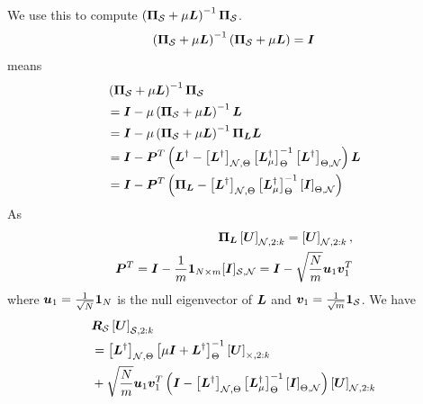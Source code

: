 We use this to compute $\left(\proj{S} + \mu\matr{L} \right)^{-1}\proj{S}$. 
\begin{equation}
 \left(\proj{S} + \mu\matr{L} \right)^{-1}\left(\proj{S} + \mu\matr{L} \right) = \matr{I}
\end{equation}
 means
\begin{align}
 &\left(\proj{S} + \mu\matr{L} \right)^{-1}\proj{S} 
 \\&= \matr{I} - \mu\left(\proj{S} + \mu\matr{L} \right)^{-1}\matr{L} \\
 &= \matr{I} - \mu\left(\proj{S} + \mu\matr{L} \right)^{-1}\projgen{\matr{L}}\matr{L} \\
 &= \matr{I} - \matr{P}^{T}\left( \matr{L}^{\dagger} - \msubgen[\set{N},\Theta]{\matr{L}^{\dagger}} \msubgen[\Theta]{ \matr{L}_{\mu}^{\dagger}}^{-1}\msubgen[\Theta,\set{N}]{\matr{L}^{\dagger}}\right)\matr{L}\\
 &= \matr{I} - \matr{P}^{T}\left( \projgen{\matr{L}} - \msubgen[\set{N},\Theta]{\matr{L}^{\dagger}} \msubgen[\Theta]{ \matr{L}_{\mu}^{\dagger}}^{-1}\msubgen[\Theta,\set{N}]{\matr{I}}\right)
\end{align}
As 
\begin{align}
\projgen{\matr{L}}\msubgen[\set{N},2:k]{\matr{U}} = \msubgen[\set{N},2:k]{\matr{U}}, \\
\matr{P}^{T} = \matr{I} - \frac{1}{m}\matr{1}_{N \times m}\matrsub[S,N]{I} = \matr{I} - \sqrt{\frac{N}{m}}\vect{u}_{1}\matr{v}_{1}^{T}
\end{align}
where $\bm{u}_{1} = \frac{1}{\sqrt{N}}\bm{1}_{N}$ is the null eigenvector of $\bm{L}$ and $\bm{v}_{1} = \frac{1}{\sqrt{m}}\bm{1}_{\mathcal{S}}$. We have
\begin{align}
    &\matr{R}_{\set{S}}\msubgen[\set{S},2:k]{\matr{U}} \\ 
    &=  \msubgen[\set{N},\Theta]{\matr{L}^{\dagger}} \msubgen[\Theta]{\mu\matr{I} + \matr{L}^{\dagger}}^{-1}\msubgen[\set{\Theta},2:k]{\matr{U}} \\
    &+ \sqrt{\frac{N}{m}}\vect{u}_{1}\vect{v}_{1}^{T}\left( \matr{I} - \msubgen[\set{N},\Theta]{\matr{L}^{\dagger}} \msubgen[\Theta]{ \matr{L}_{\mu}^{\dagger}}^{-1}\msubgen[\Theta,\set{N}]{\matr{I}}\right)\msubgen[\set{N},2:k]{\matr{U}}
\end{align}

